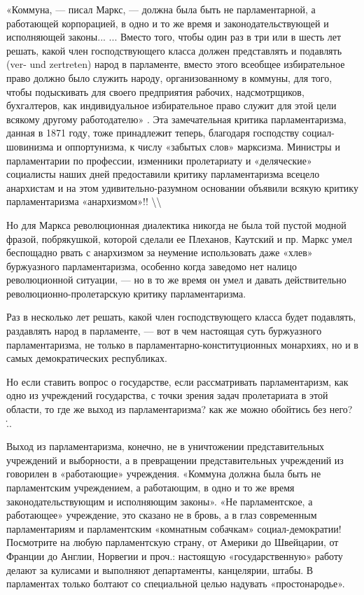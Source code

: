 \documentclass[12pt]{article}
\newcommand\ellipsis{%
  \textbackslash\thinspace\textellipsis\textbackslash
}
\newcommand{\parnum}{(\arabic{parcount})}
\newcounter{parcount}
\newenvironment{parnumbers}{%
  \par%
  \everypar{\noindent \stepcounter{parcount}\marginpar[]{\parnum}}%
}{}
\begin{document}
\begin{parnumbers}
«Коммуна, — писал Маркс, — должна была быть не парламентарной, а работающей корпорацией, в одно и то же время и законодательствующей и исполняющей законы... ... Вместо того, чтобы один раз в три или в шесть лет решать, какой член господствующего класса должен представлять и подавлять (ver- und zertreten) народ в парламенте, вместо этого всеобщее избирательное право должно было служить народу, организованному в коммуны, для того, чтобы подыскивать для своего предприятия рабочих, надсмотрщиков, бухгалтеров, как индивидуальное избирательное право служит для этой цели всякому другому работодателю» . Эта замечательная критика парламентаризма, данная в 1871 году, тоже принадлежит теперь, благодаря господству социал-шовинизма и оппортунизма, к числу «забытых слов» марксизма. Министры и парламентарии по профессии, изменники пролетариату и «деляческие» социалисты наших дней предоставили критику парламентаризма всецело анархистам и на этом удивительно-разумном основании объявили всякую критику парламентаризма «анархизмом»!! \ellipsis

Но для Маркса революционная диалектика никогда не была той пустой модной фразой, побрякушкой, которой сделали ее Плеханов, Каутский и пр. Маркс умел беспощадно рвать с анархизмом за неумение использовать даже «хлев» буржуазного парламентаризма, особенно когда заведомо нет налицо революционной ситуации, — но в то же время он умел и давать действительно революционно-пролетарскую критику парламентаризма.

Раз в несколько лет решать, какой член господствующего класса будет подавлять, раздавлять народ в парламенте, — вот в чем настоящая суть буржуазного парламентаризма, не только в парламентарно-конституционных монархиях, но и в самых демократических республиках.

Но если ставить вопрос о государстве, если рассматривать парламентаризм, как одно из учреждений государства, с точки зрения задач пролетариата в этой области, то где же выход из парламентаризма? как же можно обойтись без него? \...\

Выход из парламентаризма, конечно, не в уничтожении представительных учреждений и выборности, а в превращении представительных учреждений из говорилен в «работающие» учреждения. «Коммуна должна была быть не парламентским учреждением, а работающим, в одно и то же время законодательствующим и исполняющим законы». «Не парламентское, а работающее» учреждение, это сказано не в бровь, а в глаз современным парламентариям и парламентским «комнатным собачкам» социал-демократии! Посмотрите на любую парламентскую страну, от Америки до Швейцарии, от Франции до Англии, Норвегии и проч.: настоящую «государственную» работу делают за кулисами и выполняют департаменты, канцелярии, штабы. В парламентах только болтают со специальной целью надувать «простонародье».


\end{parnumbers}
\end{document}
